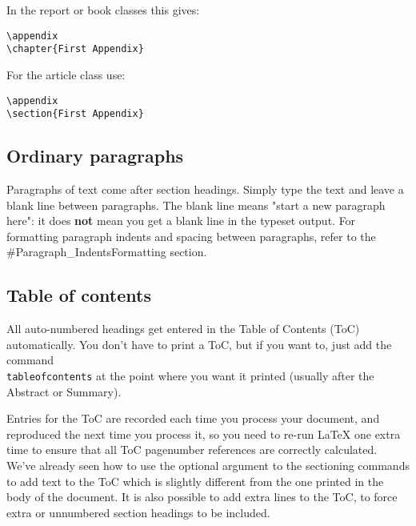 In the report or book classes this gives:
\begin{lstlisting}
\appendix
\chapter{First Appendix}
\end{lstlisting}

For the article class use:
\begin{lstlisting}
\appendix
\section{First Appendix}
\end{lstlisting}

\subsection{ Ordinary paragraphs }
Paragraphs of text come after section headings. Simply type the text and leave
a blank line between paragraphs. The blank line means "start a new paragraph
here": it does \textbf{not} mean you get a blank line in the typeset output.
For formatting paragraph indents and spacing between paragraphs, refer to the
\#Paragraph\_IndentsFormatting section.

\subsection{ Table of contents }
All auto-numbered headings get entered in the Table of Contents (ToC)
automatically. You don't have to print a ToC, but if you want to, just add the
command \texttt{\\tableofcontents} at the point where you want it printed
(usually after the Abstract or Summary).

Entries for the ToC are recorded each time you process your document, and
reproduced the next time you process it, so you need to re-run LaTeX one extra
time to ensure that all ToC pagenumber references are correctly calculated.
We've already seen how to use the optional argument to the sectioning commands
to add text to the ToC which is slightly different from the one printed in the
body of the document. It is also possible to add extra lines to the ToC, to
force extra or unnumbered section headings to be included.

